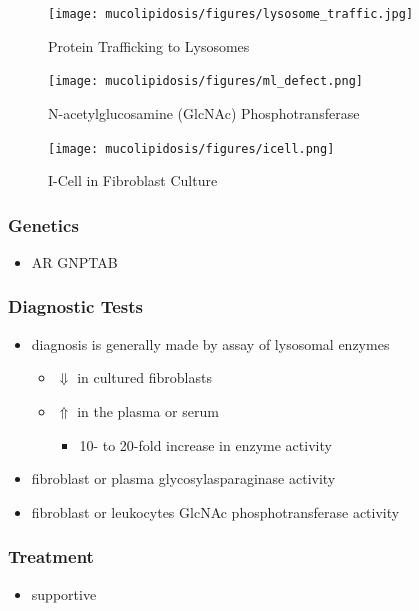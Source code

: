 \documentclass[12pt]{scrartcl}
\begin{document}
\begin{figure}[htbp]
\centering
\texttt{[image: mucolipidosis/figures/lysosome\_traffic.jpg]}
\caption[Protein trafficking to lysosomes]{\label{fig:org3ab73dd}Protein Trafficking to Lysosomes}
\end{figure}


\begin{figure}[htbp]
\centering
\texttt{[image: mucolipidosis/figures/ml\_defect.png]}
\caption[N-acetylglucosamine (GlcNAc) phosphotransferase]{\label{fig:org08e6cee}N-acetylglucosamine (GlcNAc) Phosphotransferase}
\end{figure}

\begin{figure}[htbp]
\centering
\texttt{[image: mucolipidosis/figures/icell.png]}
\caption{\label{fig:org6f443d2}I-Cell in Fibroblast Culture}
\end{figure}

\subsubsection{Genetics}
\label{sec:orgae82fbe}
\begin{itemize}
\item AR GNPTAB
\end{itemize}

\subsubsection{Diagnostic Tests}
\label{sec:org90f262c}
\begin{itemize}
\item diagnosis is generally made by assay of lysosomal enzymes
\begin{itemize}
\item \(\Downarrow\) in cultured fibroblasts
\item \(\Uparrow\) in the plasma or serum
\begin{itemize}
\item 10- to 20-fold increase in enzyme activity
\end{itemize}
\end{itemize}
\item fibroblast or plasma glycosylasparaginase activity
\item fibroblast or leukocytes GlcNAc phosphotransferase activity
\end{itemize}

\subsubsection{Treatment}
\label{sec:orgb3088b7}
\begin{itemize}
\item supportive
\end{itemize}
\end{document}
